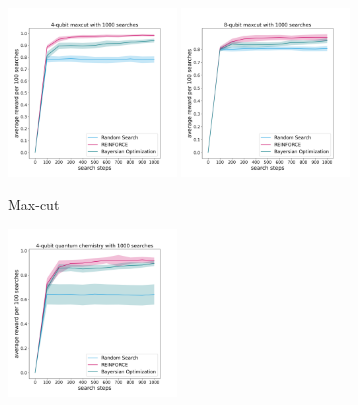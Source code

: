 \documentclass{article} %
\begin{document}
\begin{figure}[ht]
\begin{center}
\begin{subfigure}[b]{0.325\textwidth}
    \end{subfigure}
    \hspace{0.01cm}
    \begin{subfigure}[b]{0.325\textwidth}
    \includegraphics[width=0.49\textwidth]{images/4-qubits-maxcut_avg_reward_per_100_with_var_filling.png}
    \includegraphics[width=0.49\textwidth]{images/8-qubits-maxcut_avg_reward_per_100_with_var_filling.png}
    \caption{Max-cut}
    \label{max-cut}
    \end{subfigure}
    \hspace{0.01cm}
    \begin{subfigure}[b]{0.325\textwidth}
    \includegraphics[width=0.49\textwidth]{images/4-qubits-vqe_avg_reward_per_100_with_var_filling.png}

\end{subfigure}
\end{center}
\end{figure}
\end{document}
